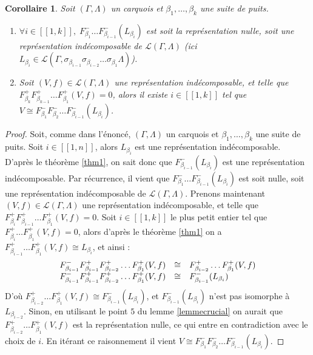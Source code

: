 \documentclass[a4paper,11pt]{article}
\newtheorem{cor}[thm]{Corollaire}%
\newcommand{\dps}{\displaystyle}
\begin{document}
\begin{cor}
\label{cor-crucial}
Soit $(\Gamma,\Lambda)$ un carquois et $\beta_1,\dots,\beta_k$ une suite de puits.
\begin{enumerate}
	\item $\forall i\in [\![1,k]\!],\;F_{\beta_1}^-\dots F_{\beta_{i-1}}^-(L_{\beta_{i}})$ est soit la représentation nulle, soit une représentation indécomposable de $\mathscr L(\Gamma,\Lambda)$ (ici $L_{\beta_i}\in\mathscr L(\Gamma,\sigma_{\beta_{i-1}}\sigma_{\beta_{i-2}}\dots\sigma_{\beta_{1}}\Lambda)$).
	\item Soit $(V,f)\in\mathscr L(\Gamma,\Lambda)$ une représentation indécomposable, et telle que $F_{\beta_k}^+F_{\beta_{k-1}}^{+}\dots F_{\beta_1}^+(V,f)=0$, alors il existe $i\in[\![1,k]\!]$ tel que $V\cong F_{\beta_{1}}^-F_{\beta_2}^-\dots F_{\beta_{i-1}}^-(L_{\beta_i})$.
\end{enumerate}
\end{cor}
\begin{proof}
	Soit, comme dans l'énoncé, $(\Gamma,\Lambda)$ un carquois et $\beta_1,\dots,\beta_k$ une suite de puits. Soit $i\in[\![1,n]\!]$, alors $L_{\beta_i}$ est une représentation indécomposable. D'après le théorème \ref{thm1}, on sait donc que $F_{\beta_{i-1}}^-(L_{\beta_{i}})$ est une représentation indécomposable. Par récurrence, il vient que $F_{\beta_1}^-\dots F_{\beta_{i-1}}^-(L_{\beta_{i}})$ est soit nulle, soit une représentation indécomposable de $\mathscr L(\Gamma,\Lambda)$. Prenons maintenant $(V,f)\in\mathscr L(\Gamma,\Lambda)$ une représentation indécomposable, et telle que $F_{\beta_i}^+F_{\beta_{i-1}}^{+}\dots F_{\beta_1}^+(V,f)=0$. Soit $i\in[\![1,k]\!]$ le plus petit entier tel que $F_{\beta_i}^+\dots F_{\beta_1}^+(V,f)=0$, alors d'après le théorème \ref{thm1} on a $F_{\beta_{i-1}}^+\dots F_{\beta_1}^+(V,f)\cong L_{\beta_i}$, et ainsi :
	\[
		\begin{array}{>{\dps}r>{\dps}l>{\dps}l}
		F_{\beta_{i-1}}^-F_{\beta_{i-1}}^+F_{\beta_{i-2}}^+\dots F_{\beta_1}^+(V,f)&\cong& F_{\beta_{i-2}}^{+}\dots F_{\beta_1}^+(V,f)\\
		 F_{\beta_{i-1}}^-F_{\beta_{i-1}}^+F_{\beta_{i-2}}^+\dots F_{\beta_1}^+(V,f)&\cong& F_{\beta_{i-1}}^-(L_{\beta_i})
		\end{array}
	\]
	D'où $F_{\beta_{i-2}}^{+}\dots F_{\beta_{1}}^{+}(V,f)\cong F_{\beta_{i-1}}^-(L_{\beta_{i}})$, et $F_{\beta_{i-1}}^{-}(L_{\beta_i})$ n'est pas isomorphe à $L_{\beta_{i-2}}$. Sinon, en utilisant le point $5$ du lemme \ref{lemmecrucial} on aurait que $F_{\beta_{i-2}}^{+}\dots F_{\beta_{1}}^{+}(V,f)$ est la représentation nulle, ce qui entre en contradiction avec le choix de $i$. En itérant ce raisonnement il vient $V\cong F_{\beta_{1}}^-F_{\beta_2}^-\dots F_{\beta_{i-1}}^-(L_{\beta_i})$.
\end{proof}
\end{document}
